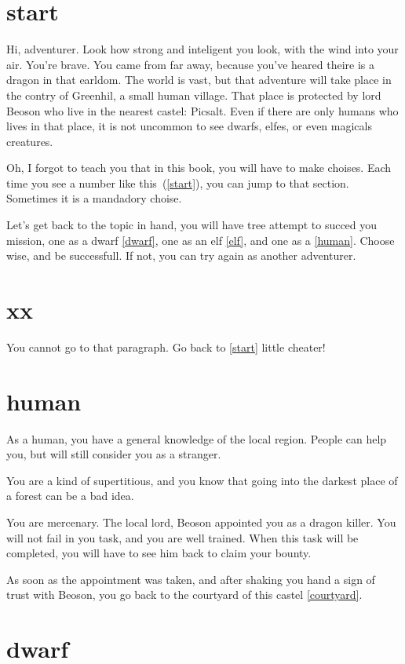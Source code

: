 \section{start}

Hi, adventurer. Look how strong and inteligent you look, with the wind into your
air. You're brave. You came from far away, because you've heared theire is a
dragon in that earldom. The world is vast, but that adventure will take place in
the contry of Greenhil, a small human village. That place is protected by lord
Beoson who live in the nearest castel: Picsalt. Even if there are only humans who
lives in that place, it is not uncommon to see dwarfs, elfes, or even magicals
creatures.

Oh, I forgot to teach you that in this book, you will have to make choises. Each
time you see a number like this~(\ref{start}), you can jump to that section.
Sometimes it is a mandadory choise.

Let's get back to the topic in hand, you will have tree attempt to succed you
mission, one as a dwarf \ref{dwarf}, one as an elf \ref{elf}, and one as a
\ref{human}. Choose wise, and be successfull. If not, you can try again as
another adventurer.

\section{xx}

You cannot go to that paragraph. Go back to \ref{start} little cheater!

\section{human}

As a human, you have a general knowledge of the local region. People can help
you, but will still consider you as a stranger.

You are a kind of supertitious, and you know that going into the darkest place
of a forest can be a bad idea.

You are mercenary. The local lord, Beoson appointed you as a dragon killer. You
will not fail in you task, and you are well trained. When this task will be
completed, you will have to see him back to claim your bounty.

As soon as the appointment was taken, and after shaking you hand a sign of trust
with Beoson, you go back to the courtyard of this castel \ref{courtyard}.

\section{dwarf}

